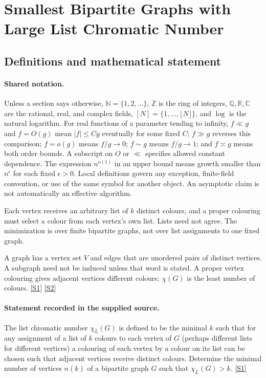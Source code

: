 \documentclass[11pt,a4paper]{article}
\newcommand{\N}{\mathbb{N}}
\newcommand{\Z}{\mathbb{Z}}
\newcommand{\Q}{\mathbb{Q}}
\newcommand{\R}{\mathbb{R}}
\newcommand{\C}{\mathbb{C}}
\newcommand{\sref}[2]{\hyperlink{source:#1:#2}{[S#2]}}
\begin{document}
\section{Smallest Bipartite Graphs with Large List Chromatic Number}\label{statement}


\subsection{Definitions and mathematical statement}

\paragraph{Shared notation.}Unless a section says otherwise, $\N=\{1,2,\ldots\}$,
$\Z$ is the ring of integers, $\Q,\R,\C$ are the rational, real, and complex
fields, $[N]=\{1,\ldots,\lfloor N\rfloor\}$, and $\log$ is the natural
logarithm. For real functions of a parameter tending to infinity,
$f\ll g$ and $f=O(g)$ mean $|f|\leq Cg$ eventually for some fixed $C$;
$f\gg g$ reverses this comparison; $f=o(g)$ means $f/g\to0$;
$f\sim g$ means $f/g\to1$; and $f\asymp g$ means both order bounds.
A subscript on $O$ or $\ll$ specifies allowed constant dependence.
The expression $n^{o(1)}$ in an upper bound means growth smaller than
$n^\epsilon$ for each fixed $\epsilon>0$. Local definitions govern any
exception, finite-field convention, or use of the same symbol for another
object. An asymptotic claim is not automatically an effective algorithm.



Each vertex receives an arbitrary list of $k$ distinct colours, and a proper colouring must select a colour from each vertex's own list. Lists need not agree. The minimization is over finite bipartite graphs, not over list assignments to one fixed graph.

A graph has a vertex set $V$ and edges that are unordered pairs of distinct vertices. A subgraph need not be induced unless that word is stated. A proper vertex colouring gives adjacent vertices different colours; $\chi(G)$ is the least number of colours. \sref{statement}{1} \sref{statement}{2}

\paragraph{Statement recorded in the supplied source.}
The list chromatic number $\chi_L(G)$ is defined to be the minimal $k$ such that for any assignment of a list of $k$ colours to each vertex of $G$ (perhaps different lists for different vertices) a colouring of each vertex by a colour on its list can be chosen such that adjacent vertices receive distinct colours.
Determine the minimal number of vertices $n(k)$ of a bipartite graph $G$ such that $\chi_L(G)>k$. \sref{statement}{1}
\end{document}
